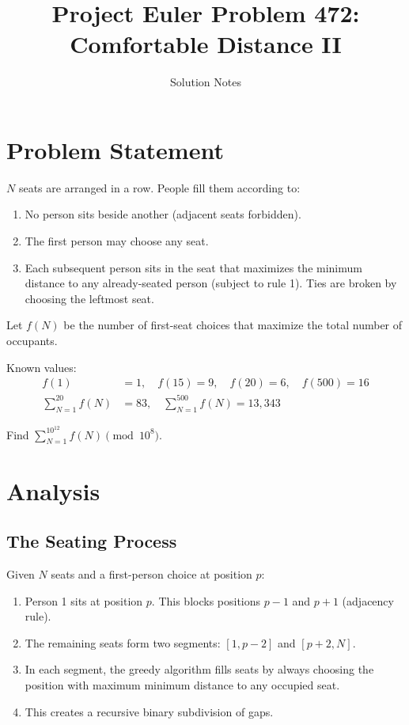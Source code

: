 \documentclass[11pt]{article}
\title{Project Euler Problem 472:\\Comfortable Distance II}
\author{Solution Notes}
\date{}
\begin{document}
\maketitle

\section{Problem Statement}

$N$ seats are arranged in a row. People fill them according to:
\begin{enumerate}
\item No person sits beside another (adjacent seats forbidden).
\item The first person may choose any seat.
\item Each subsequent person sits in the seat that maximizes the minimum distance to any already-seated person (subject to rule 1). Ties are broken by choosing the leftmost seat.
\end{enumerate}

Let $f(N)$ be the number of first-seat choices that maximize the total number of occupants.

Known values:
\begin{align}
f(1) &= 1, \quad f(15) = 9, \quad f(20) = 6, \quad f(500) = 16 \\
\sum_{N=1}^{20} f(N) &= 83, \quad \sum_{N=1}^{500} f(N) = 13{,}343
\end{align}

Find $\displaystyle\sum_{N=1}^{10^{12}} f(N) \pmod{10^8}$.

\section{Analysis}

\subsection{The Seating Process}

Given $N$ seats and a first-person choice at position $p$:

\begin{enumerate}
\item Person 1 sits at position $p$. This blocks positions $p-1$ and $p+1$ (adjacency rule).
\item The remaining seats form two segments: $[1, p-2]$ and $[p+2, N]$.
\item In each segment, the greedy algorithm fills seats by always choosing the position with maximum minimum distance to any occupied seat.
\item This creates a recursive binary subdivision of gaps.
\end{enumerate}
\end{document}

